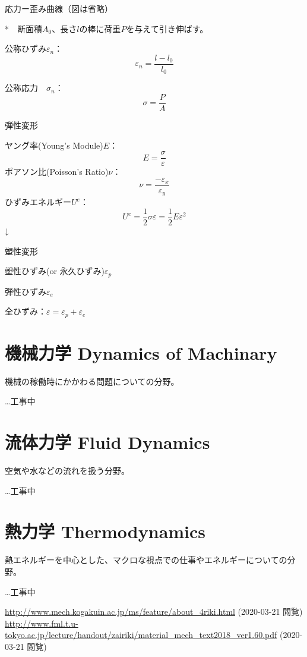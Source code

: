 \documentclass[a4j,10pt,oneside,openany]{jsbook}
\begin{document}
応力ー歪み曲線（図は省略）

*　断面積$A_0$、長さ$l$の棒に荷重$P$を与えて引き伸ばす。

公称ひずみ$\varepsilon_n$：
\[\varepsilon_n = \frac{l-l_0}{l_0}\]

公称応力　$\sigma_n$：
\[\sigma = \frac{P}{A}\]

弾性変形 

ヤング率(Young's Module)$E$：
\[E = \frac{\sigma}{\varepsilon}\]
ポアソン比(Poisson's Ratio)$\nu$：
\[\nu = \frac{-\varepsilon_x}{\varepsilon_y}\]
ひずみエネルギー$U^e$：
\[U^e = \frac{1}{2} \sigma \varepsilon = \frac{1}{2} E \varepsilon^2\]
↓

塑性変形

塑性ひずみ(or 永久ひずみ)$\varepsilon_p$

弾性ひずみ$\varepsilon_e$

全ひずみ：$\varepsilon = \varepsilon_p + \varepsilon_e$

\chapter{機械力学 Dynamics of Machinary}
機械の稼働時にかかわる問題についての分野。

…工事中


\chapter{流体力学 Fluid Dynamics}
空気や水などの流れを扱う分野。

…工事中

\chapter{熱力学 Thermodynamics}
熱エネルギーを中心とした、マクロな視点での仕事やエネルギーについての分野。

…工事中


\begin{thebibliography}{20}
  \url{http://www.mech.kogakuin.ac.jp/ms/feature/about_4riki.html} (2020-03-21 閲覧)
  \url{http://www.fml.t.u-tokyo.ac.jp/lecture/handout/zairiki/material_mech_text2018_ver1.60.pdf} (2020-03-21 閲覧)
\end{thebibliography}
\newpage
\printindex
%
%
\end{document}

